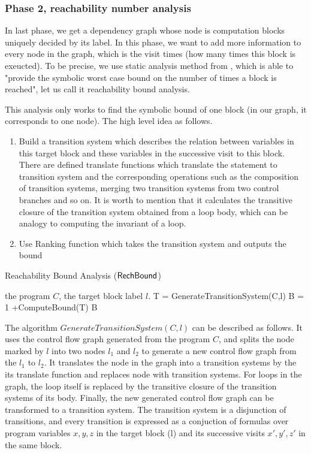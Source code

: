  

\subsubsection{Phase 2, reachability number analysis}
In last phase, we get a dependency graph whose node is computation blocks uniquely decided by its label. In this phase, we want to add more information to every node in the graph, which is the visit times (how many times this block is exeucted). To be precise, we use static analysis method from , which is able to "provide the symbolic worst case bound on the number of times a block is reached", let us call it reachability bound analysis. 

This analysis only works to find the symbolic bound of one block (in our graph, it corresponds to one node). The high level idea as follows.
\begin{enumerate}
    \item Build a transition system which describes the relation between variables in this target block and these variables in the successive visit to this block. There are defined translate functions which translate the statement to transition system and the corresponding operations such as the composition of transition systems, merging two transition systems from two control branches and so on. It is worth to mention that it calculates the transitive closure of the transition system obtained from a loop body, which can be analogy to computing the invariant of a loop.  
    \item Use Ranking function which takes the transition system and outputs the bound
\end{enumerate}

\begin{algorithm}
\caption{
{Reachability Bound Analysis ($\mathsf{RechBound}$)}
\label{alg:rb}
}
\begin{algorithmic}
\REQUIRE the program $C$, the target block label $l$.
\STATE  T  = GenerateTransitionSystem(C,l) 
\STATE B = 1 +ComputeBound(T)
\RETURN B
\end{algorithmic}
\end{algorithm}

The algorithm $GenerateTransitionSystem(C,l)$ can be described as follows. It uses the control flow graph generated from the program $C$, and splits the node marked by $l$ into two nodes $l_1$ and $l_2$ to generate a new control flow graph from the $l_1$ to $l_2$. It translates the node in the graph into a transition systems by the its translate function and replaces node with transition systems. For loops in the graph, the loop itself is replaced by the transitive closure of the transition systems of its body. Finally, the new generated control flow graph can be transformed to a transition system. The transition system is a disjunction of transitions, and every transition is expressed as a conjuction of formulas over program variables $x,y,z$ in the target block (l) and its successive visits $x',y',z'$ in the same block.

